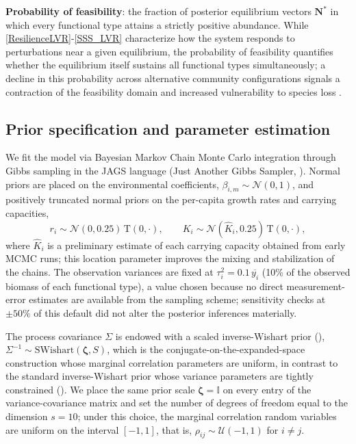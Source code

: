 \documentclass[12pt]{article}
\begin{document}
\noindent\textbf{Probability of feasibility}: the fraction of posterior equilibrium vectors $\mathbf{N}^{*}$ in which every functional type attains a strictly positive abundance. While \eqref{ResilienceLVR}-\eqref{SSS_LVR} characterize how the system responds to perturbations near a given equilibrium, the probability of feasibility quantifies whether the equilibrium itself sustains all functional types simultaneously; a decline in this probability across alternative community configurations signals a contraction of the feasibility domain and increased vulnerability to species loss \citep{Almaraz2024}.

\subsection{Prior specification and parameter estimation}

We fit the model via Bayesian Markov Chain Monte Carlo integration through Gibbs sampling in the JAGS language (Just Another Gibbs Sampler, \citep{Plummer2003}). Normal priors are placed on the environmental coefficients, $\beta_{i,m}\sim\mathcal{N}(0,1)$, and positively truncated normal priors on the per-capita growth rates and carrying capacities,
\begin{equation*}
	r_{i} \sim \mathcal{N}(0,0.25)\,\mathrm{T}(0,\cdot), \qquad K_{i} \sim \mathcal{N}(\widehat{K}_{i},0.25)\,\mathrm{T}(0,\cdot),
\end{equation*}
where $\widehat{K}_{i}$ is a preliminary estimate of each carrying capacity obtained from early MCMC runs; this location parameter improves the mixing and stabilization of the chains. The observation variances are fixed at $\tau_{i}^{2}=0.1\,\overline{y_{i}}$ (10\% of the observed biomass of each functional type), a value chosen because no direct measurement-error estimates are available from the sampling scheme; sensitivity checks at $\pm 50\%$ of this default did not alter the posterior inferences materially.

The process covariance $\Sigma$ is endowed with a scaled inverse-Wishart prior (\citealp{Huang2013}), $\Sigma^{-1}\sim\mathrm{SWishart}(\boldsymbol{\zeta},S)$, which is the conjugate-on-the-expanded-space construction whose marginal correlation parameters are uniform, in contrast to the standard inverse-Wishart prior whose variance parameters are tightly constrained (\citealp{Gelman2020,Huang2013}). We place the same prior scale $\boldsymbol{\zeta}=\mathbb{I}$ on every entry of the variance-covariance matrix and set the number of degrees of freedom equal to the dimension $s=10$; under this choice, the marginal correlation random variables are uniform on the interval $[-1,1]$, that is, $\rho_{ij}\sim\mathcal{U}(-1,1)$ for $i\neq j$.
\end{document}
